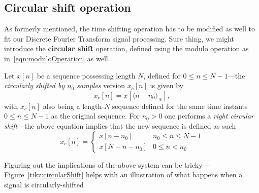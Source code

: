 \documentclass[\documentfontsize, twocolumn]{\classname}
\begin{document}
\subsection{Circular shift operation}
As formerly mentioned, the time shifting operation has to be modified as well to fit our Discrete Fourier Transform signal processing. Sure thing, we might introduce the \textbf{circular shift} operation, defined using the modulo operation as in~\ref{eqn:moduloOperation} as well.

Let $x[n]$ be a sequence possessing length $N$, defined for $0 \leq n \leq N-1$---the \emph{circularly shifted by $n_0$ samples} version $x_c[n]$ is given by
\begin{equation}\label{eqn:circularShift}
    x_c[n] = x[\langle n - n_0 \rangle_N],
\end{equation}
with $x_c[n]$ also being a length-$N$ sequence defined for the same time instants $0\leq n \leq N-1$ as the original sequence. For $n_0 > 0$ one performs a \emph{right circular shift}---the above equation implies that the new sequence is defined as such
\[
    x_c[n] =
    \left\{
        \begin{array}{ll}
            x[n-n_0] & n_0 \leq n \leq N-1\\
            x[N- n-n_0] & 0 \leq n < n_0
        \end{array}
    \right.
\]

Figuring out the implications of the above system can be tricky---Figure~\ref{tikz:circularShift} helps with an illustration of what happens when a signal is circularly-shifted
\end{document}
